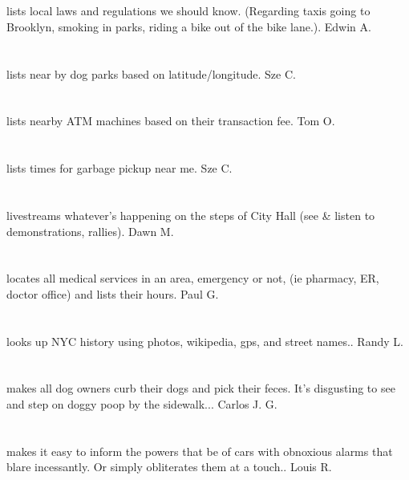 \section{}lists local laws and regulations we should know. (Regarding taxis going to Brooklyn,  smoking in parks,  riding a bike out of the bike lane.). Edwin A.
\section{}lists near by dog parks based on latitude/longitude. Sze C.
\section{}lists nearby ATM machines based on their transaction fee. Tom O.
\section{}lists times for garbage pickup near me. Sze C.
\section{} livestreams whatever's happening on the steps of City Hall (see \& listen to demonstrations,  rallies). Dawn M.
\section{}locates all medical services in an area,  emergency or not,  (ie pharmacy,  ER,  doctor office) and lists their hours. Paul G.
\section{}looks up NYC history using photos,  wikipedia,  gps,  and street names.. Randy L.
\section{}makes all dog owners curb their dogs and pick their feces. It's disgusting to see and step on doggy poop by the sidewalk... Carlos J.  G.
\section{}makes it easy to inform the powers that be of cars with obnoxious alarms that blare incessantly. Or simply obliterates them at a touch.. Louis R.
